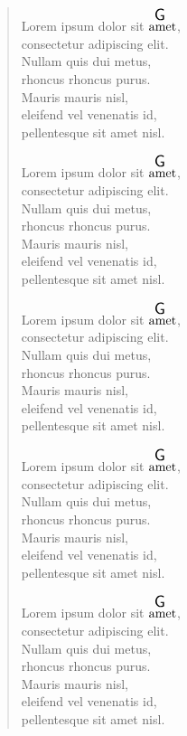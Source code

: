 \documentclass[twocolumn]{article}
\begin{document}
\begin{verse}
Lorem ipsum dolor sit $\overset{ \resizebox{0.3cm}{!}{\textsf{G}} }{\text{amet}}$, \\
consectetur adipiscing elit.\\
Nullam quis dui metus, \\
rhoncus rhoncus purus. \\
Mauris mauris nisl, \\
eleifend vel venenatis id, \\
pellentesque sit amet nisl.

Lorem ipsum dolor sit $\overset{ \resizebox{0.3cm}{!}{\textsf{G}} }{\text{amet}}$, \\
consectetur adipiscing elit.\\
Nullam quis dui metus, \\
rhoncus rhoncus purus. \\
Mauris mauris nisl, \\
eleifend vel venenatis id, \\
pellentesque sit amet nisl.

Lorem ipsum dolor sit $\overset{ \resizebox{0.3cm}{!}{\textsf{G}} }{\text{amet}}$, \\
consectetur adipiscing elit.\\
Nullam quis dui metus, \\
rhoncus rhoncus purus. \\
Mauris mauris nisl, \\
eleifend vel venenatis id, \\
pellentesque sit amet nisl.

Lorem ipsum dolor sit $\overset{ \resizebox{0.3cm}{!}{\textsf{G}} }{\text{amet}}$, \\
consectetur adipiscing elit.\\
Nullam quis dui metus, \\
rhoncus rhoncus purus. \\
Mauris mauris nisl, \\
eleifend vel venenatis id, \\
pellentesque sit amet nisl.

Lorem ipsum dolor sit $\overset{ \resizebox{0.3cm}{!}{\textsf{G}} }{\text{amet}}$, \\
consectetur adipiscing elit.\\
Nullam quis dui metus, \\
rhoncus rhoncus purus. \\
Mauris mauris nisl, \\
eleifend vel venenatis id, \\
pellentesque sit amet nisl.


\end{verse}
\end{document}
